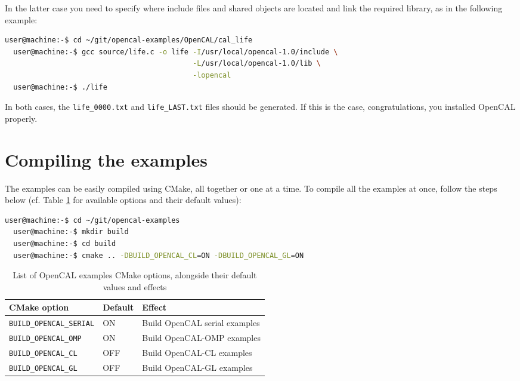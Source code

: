 In the latter case you need to specify where include files and shared objects are located
and link the required library, as in the following example:
\begin{lstlisting}[numbers=none,language=bash,label={ch:quickstart:gcc-full}]
  user@machine:-$ cd ~/git/opencal-examples/OpenCAL/cal_life
  user@machine:-$ gcc source/life.c -o life -I/usr/local/opencal-1.0/include \
                                            -L/usr/local/opencal-1.0/lib \
                                            -lopencal
  user@machine:-$ ./life
\end{lstlisting}

In both cases, the \verb'life_0000.txt' and \verb'life_LAST.txt' files
should be generated. If this is the case, congratulations, you
installed OpenCAL properly.



\section{Compiling the examples}

The examples can be easily compiled using CMake, all together or one
at a time. To compile all the examples at once, follow the steps below
(cf. Table \ref{ch:installation:cmakeoptions-example} for available
options and their default values):

\begin{lstlisting}[numbers=none,language=bash]
  user@machine:-$ cd ~/git/opencal-examples
  user@machine:-$ mkdir build
  user@machine:-$ cd build
  user@machine:-$ cmake .. -DBUILD_OPENCAL_CL=ON -DBUILD_OPENCAL_GL=ON
\end{lstlisting}


\begin{table}[h]
  \centering
  \caption{List of OpenCAL examples CMake options, alongside their default values and
    effects}
  \label{ch:installation:cmakeoptions-example}
  \begin{tabular}{lll}
    \hline
    CMake option &  Default & Effect\\
    \hline
    \verb'BUILD_OPENCAL_SERIAL' & ON  & Build OpenCAL serial examples\\
    \verb'BUILD_OPENCAL_OMP'    & ON  & Build OpenCAL-OMP examples\\
    \verb'BUILD_OPENCAL_CL'     & OFF & Build OpenCAL-CL examples\\
    \verb'BUILD_OPENCAL_GL'     & OFF & Build OpenCAL-GL examples\\
     \hline
  \end{tabular}
\end{table}


